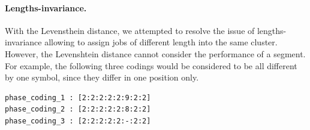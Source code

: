 \documentclass{jhps}
\begin{document}

\medskip

\paragraph{Lengths-invariance.}
With the Levensthein distance, we attempted to resolve the issue of lengths-invariance allowing to assign jobs of different length into the same cluster.
However, the Levenshtein distance cannot consider the performance of a segment.
For example, the following three codings would be considered to be all different by one symbol, since they differ in one position only.

\begin{lstlisting}
phase_coding_1 : [2:2:2:2:2:9:2:2]
phase_coding_2 : [2:2:2:2:2:8:2:2]
phase_coding_3 : [2:2:2:2:2:-:2:2]
\end{lstlisting}
\end{document}
